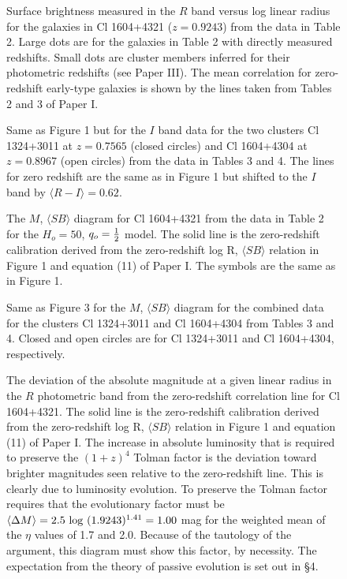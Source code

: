\documentclass[preprint]{aastex}
\begin{document}
\clearpage

\begin{figure}
\caption{Surface brightness measured in the $R$ band versus log linear
radius for the galaxies in Cl 1604+4321 ($z = 0.9243$) from the data
in Table 2. Large dots are for the galaxies in Table 2 with directly
measured redshifts. Small dots are cluster members inferred for their
photometric redshifts (see Paper III). The mean correlation for
zero-redshift early-type galaxies is shown by the lines taken from
Tables 2 and 3 of Paper I.}
\end{figure}

\begin{figure}
\caption{Same as Figure 1 but for the $I$ band data for the two
clusters Cl 1324+3011 at $z = 0.7565$ (closed circles) and Cl
1604+4304 at $z = 0.8967$ (open circles) from the data in Tables 3 and
4. The lines for zero redshift are the same as in Figure 1 but shifted
to the $I$ band by $\langle R-I \rangle = 0.62$.}
\end{figure}

\begin{figure}
\caption{The $M$, $\langle SB \rangle$ diagram for Cl 1604+4321 from
the data in Table 2 for the $H_o = 50$, $q_o = {1\over{2}}$ model. The
solid line is the zero-redshift calibration derived from the
zero-redshift log R, $\langle SB \rangle$ relation in Figure 1 and
equation (11) of Paper I. The symbols are the same as in Figure 1.}
\end{figure}

\begin{figure}
\caption{Same as Figure 3 for the $M$, $\langle SB \rangle$ diagram
for the combined data for the clusters Cl 1324+3011 and Cl 1604+4304
from Tables 3 and 4. Closed and open circles are for Cl 1324+3011 and
Cl 1604+4304, respectively.}
\end{figure}

\begin{figure}
\caption{The deviation of the absolute magnitude at a given linear
radius in the $R$ photometric band from the zero-redshift correlation
line for Cl 1604+4321. The solid line is the zero-redshift calibration
derived from the zero-redshift log R, $\langle SB \rangle$ relation in
Figure 1 and equation (11) of Paper I. The increase in absolute
luminosity that is required to preserve the $(1+z)^4$ Tolman factor is
the deviation toward brighter magnitudes seen relative to the
zero-redshift line. This is clearly due to luminosity evolution. To
preserve the Tolman factor requires that the evolutionary factor must
be $\langle \Delta M \rangle = 2.5~{\rm log}~(1.9243)^{1.41} = 1.00$
mag for the weighted mean of the $\eta$ values of 1.7 and 2.0. Because
of the tautology of the argument, this diagram must show this factor,
by necessity. The expectation from the theory of passive evolution is
set out in \S 4.}
\end{figure}
\end{document}

